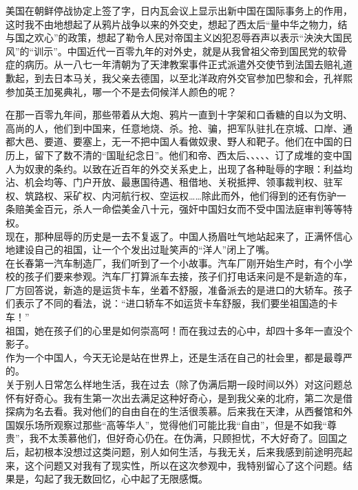 美国在朝鲜停战协定上签了字，日内瓦会议上显示出新中国在国际事务上的作用，这时我不由地想起了从鸦片战争以来的外交史，想起了西太后“量中华之物力，结与国之欢心”的政策，想起了勒令人民对帝国主义凶犯忍辱吞声以表示“泱泱大国民风”的“训示”。中国近代一百零九年的对外史，就是从我曾祖父帝到国民党的软骨症的病历。从一八七一年清朝为了天津教案事件正式派遣外交使节到法国去赔礼道歉起，到去日本马关，我父亲去德国，以至北洋政府外交官参加巴黎和会，孔祥熙参加英王加冕典礼，哪一个不是去伺候洋人颜色的呢？

在那一百零九年间，那些带着从大炮、鸦片一直到十字架和口香糖的自以为文明、高尚的人，他们到中国来，任意地烧、杀。抢、骗，把军队驻扎在京城、口岸、通都大邑、要道、要塞上，无一不把中国人看做奴隶、野人和靶子。他们在中国的日历上，留下了数不清的“国耻纪念日”。他们和帝、西太后、、、、、订了成堆的变中国人为奴隶的条约。以致在近百年的外交关系史上，出现了各种耻辱的字眼：利益均沾、机会均等、门户开放、最惠国待遇、租借地、关税抵押、领事裁判权、驻军权、筑路权、采矿权、内河航行权、空运权……除此而外，他们得到的还有伤驴一条赔美金百元，杀人一命偿美金八十元，强奸中国妇女而不受中国法庭审判等等特权。\\

现在，那种屈辱的历史是一去不复返了。中国人扬眉吐气地站起来了，正满怀信心地建设自己的祖国，让一个个发出过耻笑声的“洋人”闭上了嘴。\\

在长春第一汽车制造厂，我们听到了一个小故事。汽车厂刚开始生产时，有个小学校的孩子们要来参观。汽车厂打算派车去接，孩子们打电话来问是不是新造的车，厂方回答说，新造的是运货卡车，坐着不舒服，准备派去的是进口的大轿车。孩子们表示了不同的看法，说：“进口轿车不如运货卡车舒服，我们要坐祖国造的卡车！”\\

祖国，她在孩子们的心里是如何崇高呵！而在我过去的心中，却四十多年一直没个影子。\\

作为一个中国人，今天无论是站在世界上，还是生活在自己的社会里，都是最尊严的。\\

关于别人日常怎么样地生活，我在过去（除了伪满后期一段时间以外）对这问题总怀有好奇心。我有生第一次出去满足这种好奇心，是到我父亲的北府，第二次是借探病为名去看。我对他们的自由自在的生活很羡慕。后来我在天津，从西餐馆和外国娱乐场所观察过那些“高等华人”，觉得他们可能比我“自由”，但是不如我“尊贵”，我不太羡慕他们，但好奇心仍在。在伪满，只顾担忧，不大好奇了。回国之后，起初根本没想过这类问题，别人如何生活，与我无关，后来我感到前途明亮起来，这个问题又对我有了现实性，所以在这次参观中，我特别留心了这个问题。结果是，勾起了我无数回忆，心中起了无限感慨。\\

